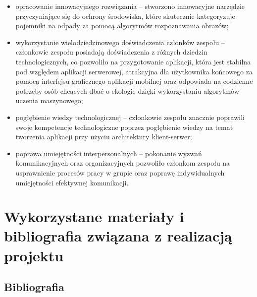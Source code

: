 \documentclass[12pt, a4paper, twoside, openany]{book}
\begin{document}
{\begin{itemize}[label=--]
    \item opracowanie innowacyjnego rozwiązania -- stworzono innowacyjne narzędzie przyczyniające się do ochrony środowiska, które skutecznie kategoryzuje pojemniki na odpady za pomocą algorytmów rozpoznawania obrazów;
    \item wykorzystanie wielodziedzinowego doświadczenia członków zespołu -- członkowie zespołu posiadają doświadczenia z różnych dziedzin technologicznych, co pozwoliło na przygotowanie aplikacji, która jest stabilna pod względem aplikacji serwerowej, atrakcyjna dla użytkownika końcowego za pomocą interfejsu graficznego aplikacji mobilnej oraz odpowiada na codzienne potrzeby osób chcących dbać o ekologię dzięki wykorzystaniu algorytmów uczenia maszynowego;
    \item pogłębienie wiedzy technologicznej -- członkowie zespołu znacznie poprawili swoje kompetencje technologiczne poprzez pogłębienie wiedzy na temat tworzenia aplikacji przy użyciu architektury klient-serwer;
    \item poprawa umiejętności interpersonalnych -- pokonanie wyzwań komunikacyjnych oraz organizacyjnych pozwoliło członkom zespołu na usprawnienie procesów pracy w grupie oraz poprawę indywidualnych umiejętności efektywnej komunikacji.
\end{itemize}

\section{Wykorzystane materiały i bibliografia związana z realizacją projektu}

\subsection{Bibliografia}

}
\end{document}
